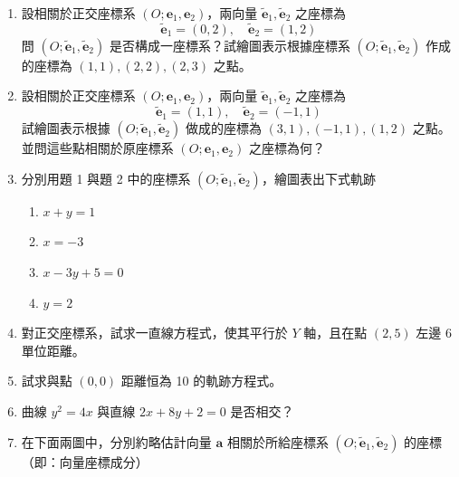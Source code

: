 \begin{enumerate}[label=\arabic*., leftmargin=2em]
  \item 設相關於正交座標系 $(O; \mathbf{e}_1, \mathbf{e}_2)$，兩向量 $\tilde{\mathbf{e}}_1, \tilde{\mathbf{e}}_2$ 之座標為
  \[ \tilde{\mathbf{e}}_1 = (0, 2), \quad \tilde{\mathbf{e}}_2 = (1, 2) \]
  問 $(O; \tilde{\mathbf{e}}_1, \tilde{\mathbf{e}}_2)$ 是否構成一座標系？試繪圖表示根據座標系 $(O; \tilde{\mathbf{e}}_1, \tilde{\mathbf{e}}_2)$ 作成的座標為 $(1, 1), (2, 2), (2, 3)$ 之點。
  
  \item 設相關於正交座標系 $(O; \mathbf{e}_1, \mathbf{e}_2)$，兩向量 $\tilde{\mathbf{e}}_1, \tilde{\mathbf{e}}_2$ 之座標為
  \[ \tilde{\mathbf{e}}_1 = (1, 1), \quad \tilde{\mathbf{e}}_2 = (-1, 1) \]
  試繪圖表示根據 $(O; \tilde{\mathbf{e}}_1, \tilde{\mathbf{e}}_2)$ 做成的座標為 $(3, 1), (-1, 1), (1, 2)$ 之點。並問這些點相關於原座標系 $(O; \mathbf{e}_1, \mathbf{e}_2)$ 之座標為何？
  
  \item 分別用題 1 與題 2 中的座標系 $(O; \tilde{\mathbf{e}}_1, \tilde{\mathbf{e}}_2)$，繪圖表出下式軌跡
  \begin{enumerate}[label=\roman*), leftmargin=2em]
    \item $x + y = 1$
    \item $x = -3$
    \item $x - 3y + 5 = 0$
    \item $y = 2$
  \end{enumerate}
  
  \item 對正交座標系，試求一直線方程式，使其平行於 $Y$ 軸，且在點 $(2, 5)$ 左邊 6 單位距離。
  
  \item 試求與點 $(0, 0)$ 距離恒為 10 的軌跡方程式。
  
  \item 曲線 $y^2 = 4x$ 與直線 $2x + 8y + 2 = 0$ 是否相交？
  
  \item 在下面兩圖中，分別約略估計向量 $\mathbf{a}$ 相關於所給座標系 $(O; \tilde{\mathbf{e}}_1, \tilde{\mathbf{e}}_2)$ 的座標（即：向量座標成分）
  
  \begin{center}
\end{center}
\end{enumerate}
